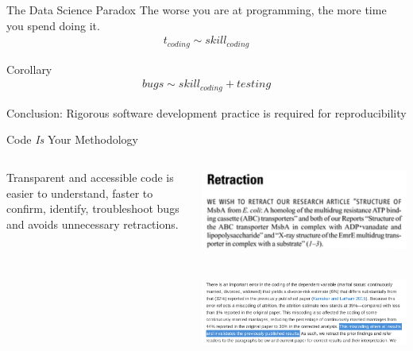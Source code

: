 \documentclass{beamer}
\begin{document}
\begin{frame}{The Data Science Paradox}
The worse you are at programming, the more time you spend doing it.
\begin{align}
t_{coding} \sim skill_{coding}
\end{align}

\pause
Corollary
\begin{align}
bugs \sim skill_{coding} + testing
\end{align}

\pause
Conclusion: Rigorous software development practice is required for reproducibility

\end{frame}



\begin{frame}{Code \emph{Is} Your Methodology}

\begin{columns}
\begin{column}{.5\linewidth}
Transparent and accessible code is easier to understand,
faster to confirm, identify, troubleshoot bugs
and \alert{avoids unnecessary retractions}.
\end{column}


\begin{column}{.5\linewidth}
\includegraphics[width=\linewidth]{images/retraction_2}

~\\

\includegraphics[width=\linewidth]{images/retraction_1}


\end{column}
\end{columns}
\end{frame}
\end{document}
